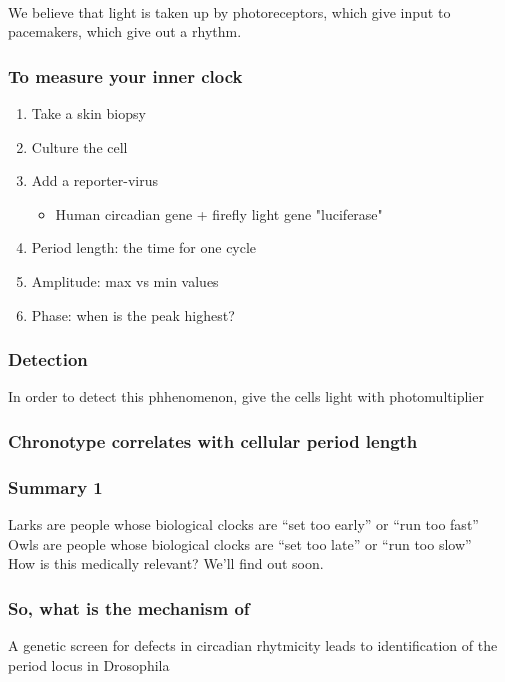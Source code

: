 \begin{itemize}
\begin{itemize}
\\We believe that light is taken up by photoreceptors, which give input to pacemakers, which give out a rhythm.


\subsubsection{To measure your inner clock}
\begin{enumerate}
    \item Take a skin biopsy
    \item Culture the cell
    \item Add a reporter-virus
    \begin{itemize}
        \item Human circadian gene + firefly light gene "luciferase"
    \end{itemize}
    \item Period length: the time for one cycle
    \item Amplitude: max vs min values
    \item Phase: when is the peak highest?
\end{enumerate}

\subsubsection{Detection}
In order to detect this phhenomenon, give the cells light with photomultiplier
\subsubsection{Chronotype correlates with cellular period length}

\subsubsection{Summary 1}
Larks are people whose biological clocks are “set
too early” or “run too fast”
\\Owls are people whose biological clocks are “set
too late” or “run too slow”
\\How is this medically relevant? We’ll find out soon.

\subsubsection{So, what is the mechanism of}
A genetic screen for defects in circadian rhytmicity leads to identification of the period locus in Drosophila


\end{itemize}
\end{itemize}
